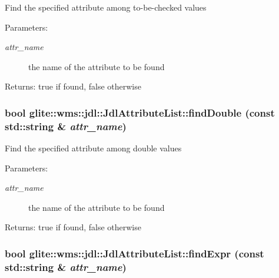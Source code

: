Find the specified attribute among to-be-checked values \begin{Desc}
\item[Parameters:]
\begin{description}
\item[{\em attr\_\-name}]the name of the attribute to be found \end{description}
\end{Desc}
\begin{Desc}
\item[Returns:]true if found, false otherwise \end{Desc}
\hypertarget{classglite_1_1wms_1_1jdl_1_1JdlAttributeList_a5}{
\subsubsection[findDouble]{\setlength{\rightskip}{0pt plus 5cm}bool glite::wms::jdl::Jdl\-Attribute\-List::find\-Double (const std::string \& {\em attr\_\-name})}}
\label{classglite_1_1wms_1_1jdl_1_1JdlAttributeList_a5}


Find the specified attribute among double values \begin{Desc}
\item[Parameters:]
\begin{description}
\item[{\em attr\_\-name}]the name of the attribute to be found \end{description}
\end{Desc}
\begin{Desc}
\item[Returns:]true if found, false otherwise \end{Desc}
\hypertarget{classglite_1_1wms_1_1jdl_1_1JdlAttributeList_a8}{
\subsubsection[findExpr]{\setlength{\rightskip}{0pt plus 5cm}bool glite::wms::jdl::Jdl\-Attribute\-List::find\-Expr (const std::string \& {\em attr\_\-name})}}
\label{classglite_1_1wms_1_1jdl_1_1JdlAttributeList_a8}


